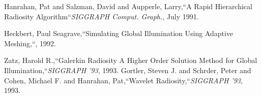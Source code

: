 \begin{thebibliography}{99}
Hanrahan, Pat and Salzman, David and Aupperle, Larry,``A Rapid Hierarchical Radiosity Algorithm``\emph{SIGGRAPH Comput. Graph.}, July 1991.


 Heckbert, Paul Seagrave,``Simulating Global Illumination Using Adaptive Meshing,``, 1992.


 Zatz, Harold R.,``Galerkin Radiosity A Higher Order Solution Method  for Global Illumination,``\emph{SIGGRAPH '93}, 1993.
Gortler, Steven J. and Schrder, Peter and Cohen, Michael F. and Hanrahan, Pat,``Wavelet Radiosity,``\emph{SIGGRAPH '93}, 1993.

\end{thebibliography}

\begin{frame}[noframenumbering]\frametitle{}

\end{frame}